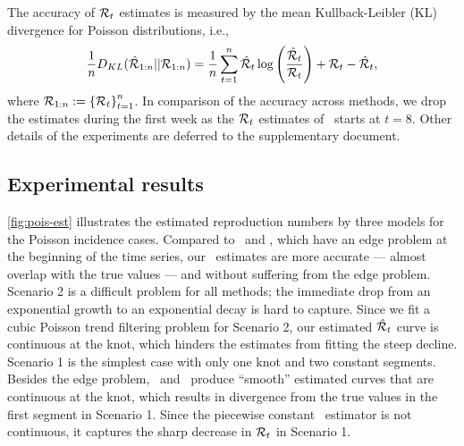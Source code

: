 The accuracy of $\mathcal{R}_t$ estimates is measured by the mean Kullback-Leibler (KL) divergence for Poisson distributions, i.e., $$\frac{1}{n} D_{KL}(\hat{\mathcal{R}}_{1:n}|| \mathcal{R}_{1:n}) = \frac{1}{n}\sum_{t=1}^n \hat{\mathcal{R}}_t \log\left(\frac{\hat{\mathcal{R}}_t}{\mathcal{R}_t}\right) + {\mathcal{R}}_t - \hat{\mathcal{R}}_t,$$ where $\mathcal{R}_{1:n} := \left\{ \mathcal{R}_t \right\}_{t=1}^n$. In comparison of the accuracy across methods, we drop the estimates during the first week as the $\mathcal{R}_t$ estimates of \EpiEstim\ starts at $t=8$. 
Other details of the experiments are deferred to the supplementary document. 

\subsection{Experimental results}

\autoref{fig:pois-est} illustrates the estimated reproduction numbers by three models for the Poisson incidence cases. Compared to \EpiEstim\ and \EpiLPS, which have an edge problem at the beginning of the time series, our \RtEstim\ estimates are more accurate --- almost overlap with the true values --- and without suffering from the edge problem. Scenario 2 is a difficult problem for all methods; the immediate drop from an exponential growth to an exponential decay is hard to capture. Since we fit a cubic Poisson trend filtering problem for Scenario 2, our estimated $\hat{\mathcal{R}}_t$ curve is continuous at the knot, which hinders the estimates from fitting the steep decline. 
Scenario 1 is the simplest case with only one knot and two constant segments. Besides the edge problem, \EpiEstim\ and \EpiLPS\ produce ``smooth'' estimated curves that are continuous at the knot, which results in divergence from the true values in the first segment in Scenario 1. Since the piecewise constant \RtEstim\ estimator is not continuous, it captures the sharp decrease in $\mathcal{R}_t$ in Scenario 1. 
